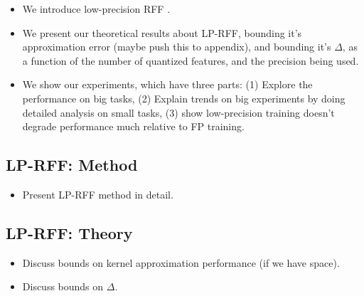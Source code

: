 \begin{itemize}
	\item We introduce low-precision RFF .
	\item We present our theoretical results about LP-RFF, bounding it's approximation error (maybe push this to appendix), and bounding it's $\Delta$, as a function of the number of quantized features, and the precision being used.
	\item We show our experiments, which have three parts: (1) Explore the performance on big tasks, (2) Explain trends on big experiments by doing detailed analysis on small tasks, (3) show low-precision training doesn't degrade performance much relative to FP training.
\end{itemize}

\subsection{LP-RFF: Method}
\begin{itemize}
	\item Present LP-RFF method in detail.
\end{itemize}
\subsection{LP-RFF: Theory}
\begin{itemize}
	\item Discuss bounds on kernel approximation performance (if we have space).
	\item Discuss bounds on $\Delta$.
\end{itemize}
